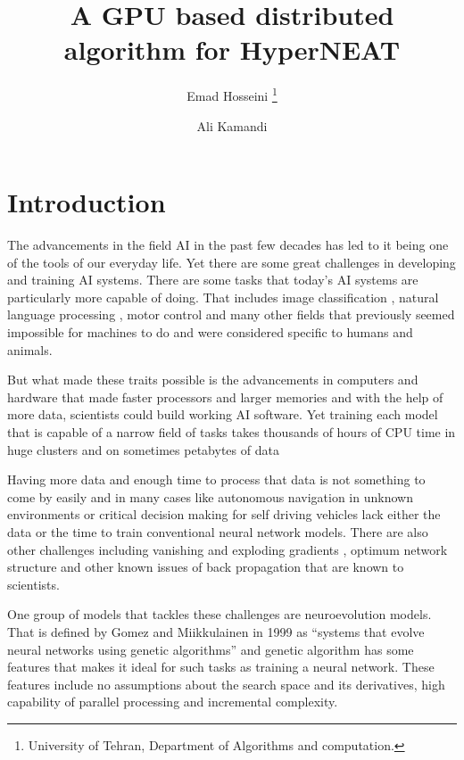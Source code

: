 \documentclass[twocolumn]{article}
\title{A GPU based distributed algorithm for HyperNEAT}
\author{Emad Hosseini \thanks{University of Tehran, 
Department of Algorithms and computation.} 
\and Ali Kamandi}
\begin{document}
\maketitle


\section{Introduction}

The advancements in the field AI in the past few decades has led to it being one of the tools of our everyday life. Yet there are some great challenges in developing and training AI systems. There are some tasks that today's AI systems are particularly more capable of doing. That includes image classification \cite{DeepImageClassificationReview}, natural language processing \cite{NLPReview}, motor control \cite{DeepRlforMotorControl} and many other fields that previously seemed impossible for machines to do and were considered specific to humans and animals.

But what made these traits possible is the advancements in computers and hardware that made faster processors and larger memories and with the help of more data, scientists could build working AI software. Yet training each model that is capable of a narrow field of tasks takes thousands of hours of CPU time in huge clusters and on sometimes petabytes of data \cite{NEAT-Hardware-IEEE}

Having more data and enough time to process that data is not something to come by easily and in many cases like autonomous navigation in unknown environments or critical decision making for self driving vehicles lack either the data or the time to train conventional neural network models. There are also other challenges including vanishing and exploding gradients \cite{ExplodingAndVanishingGradients}, optimum network structure and other known issues of back propagation that are known to scientists. 

One group of models that tackles these challenges are neuroevolution models. That is defined by Gomez and  Miikkulainen in 1999 as ``systems that evolve neural networks using genetic algorithms'' \cite{NEDefenitionMiikkulainen} and genetic algorithm has some features that makes it ideal for such tasks as training a neural network. These features include no assumptions about the search space and its derivatives, high capability of parallel processing and incremental complexity.
\end{document}
